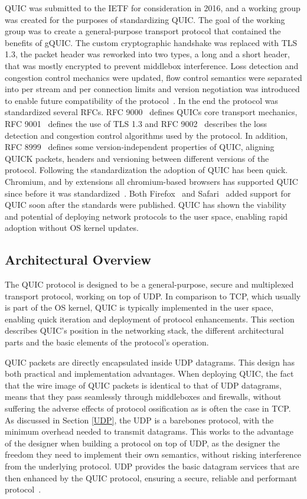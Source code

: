 \documentclass[english, 12pt, a4paper, elec, utf8, a-2b, online]{aaltothesis}
\begin{document}
QUIC was submitted to the IETF for consideration in 2016, and a working group
was created for the purposes of standardizing QUIC. The goal of the working group
was to create a general-purpose transport protocol that contained the benefits
of gQUIC. The custom cryptographic handshake was replaced with TLS 1.3, the packet header
was reworked into two types, a long and a short header, that was mostly encrypted
to prevent middlebox interference. Loss detection and congestion control mechanics
were updated, flow control semantics were separated into per stream and per connection
limits and version negotiation was introduced to enable future compatibility of the
protocol~\cite{rfc9000}. In the end the protocol was standardized several RFCs.
RFC 9000~\cite{rfc9000} defines QUICs core transport mechanics, RFC 9001~\cite{rfc9001} defines the use of TLS 1.3
and RFC 9002~\cite{rfc9002} describes the loss detection and congestion control algorithms used by the
protocol. In addition, RFC 8999~\cite{rfc8999} defines some version-independent
properties of QUIC, aligning QUICK packets, headers and versioning between
different versions of the protocol. Following the standardization the adoption
of QUIC has been quick. Chromium, and by extensions all chromium-based browsers
has supported QUIC since before it was standardized~\cite{chromium_quic}. Both
Firefox~\cite{firefox_quic} and Safari~\cite{safari_quic} added support for QUIC
soon after the standards were published. QUIC has shown the viability and potential
of deploying network protocols to the user space, enabling rapid adoption without
OS kernel updates.

\subsection{Architectural Overview}

The QUIC protocol is designed to be a general-purpose, secure and multiplexed
transport protocol, working on top of UDP. In comparison to TCP, which usually
is part of the OS kernel, QUIC is typically implemented in the user space, enabling
quick iteration and deployment of protocol enhancements. This section describes
QUIC's position in the networking stack, the different architectural parts and the
basic elements of the protocol's operation.

QUIC packets are directly encapsulated inside UDP datagrams. This design has both 
practical and implementation advantages. When deploying QUIC, the fact that the
wire image of QUIC packets is identical to that of UDP datagrams, means that they
pass seamlessly through middleboxes and firewalls, without suffering the adverse
effects of protocol ossification as is often the case in TCP. As discussed in Section \ref{UDP},
the UDP is a barebones protocol, with the minimum overhead needed to transmit datagrams. This
works to the advantage of the designer when building a protocol on top of UDP, as
the designer the freedom they need to implement their own semantics, without risking
interference from the underlying protocol. UDP provides the basic datagram services
that are then enhanced by the QUIC protocol, ensuring a secure, reliable and performant
protocol~\cite{quic_transport_protocol_design}.
\end{document}
